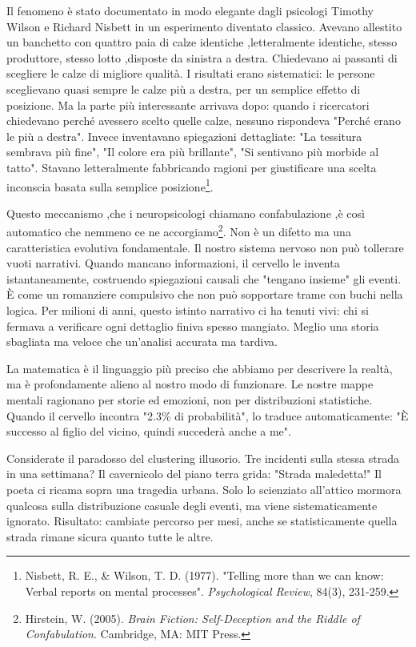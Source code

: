 Il fenomeno è stato documentato in modo elegante dagli psicologi Timothy Wilson e Richard Nisbett in un esperimento diventato classico. Avevano allestito un banchetto con quattro paia di calze identiche ,letteralmente identiche, stesso produttore, stesso lotto ,disposte da sinistra a destra. Chiedevano ai passanti di scegliere le calze di migliore qualità. I risultati erano sistematici: le persone sceglievano quasi sempre le calze più a destra, per un semplice effetto di posizione. Ma la parte più interessante arrivava dopo: quando i ricercatori chiedevano perché avessero scelto quelle calze, nessuno rispondeva "Perché erano le più a destra". Invece inventavano spiegazioni dettagliate: "La tessitura sembrava più fine", "Il colore era più brillante", "Si sentivano più morbide al tatto". Stavano letteralmente fabbricando ragioni per giustificare una scelta inconscia basata sulla semplice posizione\footnote{Nisbett, R. E., \& Wilson, T. D. (1977). "Telling more than we can know: Verbal reports on mental processes". \textit{Psychological Review}, 84(3), 231-259.}.

Questo meccanismo ,che i neuropsicologi chiamano confabulazione ,è così automatico che nemmeno ce ne accorgiamo\footnote{Hirstein, W. (2005). \textit{Brain Fiction: Self-Deception and the Riddle of Confabulation}. Cambridge, MA: MIT Press.}. Non è un difetto ma una caratteristica evolutiva fondamentale. Il nostro sistema nervoso non può tollerare vuoti narrativi. Quando mancano informazioni, il cervello le inventa istantaneamente, costruendo spiegazioni causali che "tengano insieme" gli eventi. È come un romanziere compulsivo che non può sopportare trame con buchi nella logica. Per milioni di anni, questo istinto narrativo ci ha tenuti vivi: chi si fermava a verificare ogni dettaglio finiva spesso mangiato. Meglio una storia sbagliata ma veloce che un'analisi accurata ma tardiva.

La matematica è il linguaggio più preciso che abbiamo per descrivere la realtà, ma è profondamente alieno al nostro modo di funzionare. Le nostre mappe mentali ragionano per storie ed emozioni, non per distribuzioni statistiche. Quando il cervello incontra "2.3\% di probabilità", lo traduce automaticamente: "È successo al figlio del vicino, quindi succederà anche a me".

Considerate il paradosso del clustering illusorio. Tre incidenti sulla stessa strada in una settimana? Il cavernicolo del piano terra grida: "Strada maledetta!" Il poeta ci ricama sopra una tragedia urbana. Solo lo scienziato all'attico mormora qualcosa sulla distribuzione casuale degli eventi, ma viene sistematicamente ignorato. Risultato: cambiate percorso per mesi, anche se statisticamente quella strada rimane sicura quanto tutte le altre.

